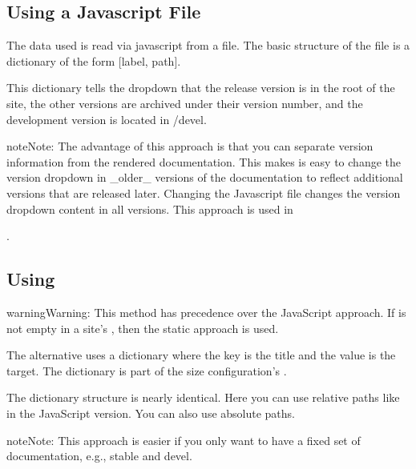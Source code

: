 \documentclass[letterpaper,10pt,english]{sphinxmanual}
\begin{document}
\subsection{Using a Javascript File}
\label{\detokenize{customization:using-a-javascript-file}}
The data used is read via javascript from a file. The basic structure of the file is a dictionary of the form {[}label, path{]}.

This dictionary tells the dropdown that the release version is in the root of the site, the
other versions are archived under their version number, and the development version is
located in /devel.

\begin{sphinxadmonition}{note}{Note:}
The advantage of this approach is that you can separate version information
from the rendered documentation.  This makes is easy to change the version
dropdown in \_older\_ versions of the documentation to reflect additional versions
that are released later. Changing the Javascript file changes the version dropdown
content in all versions.  This approach is used in
%
\begin{footnote}[7]\sphinxAtStartFootnote
{}
%
\end{footnote}.
\end{sphinxadmonition}


\subsection{Using }
\label{\detokenize{customization:using-conf-py}}
\begin{sphinxadmonition}{warning}{Warning:}
This method has precedence over the JavaScript approach. If  is
not empty in a site’s , then the static approach is used.
\end{sphinxadmonition}

The alternative uses a dictionary where the key is the title and the value is the target.
The dictionary is part of the size configuration’s .

The dictionary structure is nearly identical.  Here you can use relative paths
like in the JavaScript version. You can also use absolute paths.

\begin{sphinxadmonition}{note}{Note:}
This approach is easier if you only want to have a fixed set of documentation,
e.g., stable and devel.
\end{sphinxadmonition}
\end{document}
